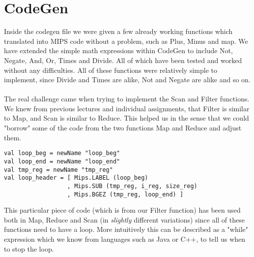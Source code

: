\documentclass[12pt]{article}
\begin{document}
\section{CodeGen}
Inside the codegen file we were given a few already working functions which translated into MIPS code without a problem, such as Plus, Minus and map. We have extended the simple math expressions within CodeGen to include Not, Negate, And, Or, Times and Divide. All of which have been tested and worked without any difficulties. All of these functions were relatively simple to implement, since Divide and Times are alike, Not and Negate are alike and so on.\\\\
The real challenge came when trying to implement the Scan and Filter functions. We knew from previous lectures and individual assignments, that Filter is similar to Map, and Scan is similar to Reduce. This helped us in the sense that we could "borrow" some of the code from the two functions Map and Reduce and adjust them.
\begin{verbatim}
val loop_beg = newName "loop_beg"
val loop_end = newName "loop_end"
val tmp_reg = newName "tmp_reg"
val loop_header = [ Mips.LABEL (loop_beg)
                  , Mips.SUB (tmp_reg, i_reg, size_reg)
                  , Mips.BGEZ (tmp_reg, loop_end) ]
\end{verbatim}
This particular piece of code (which is from our Filter function) has been used both in Map, Reduce and Scan (in \textit{slightly} different variations) since all of these functions need to have a loop. More intuitively this can be described as a "while" expression which we know from languages such as Java or C++, to tell us when to stop the loop. 
\end{document}
